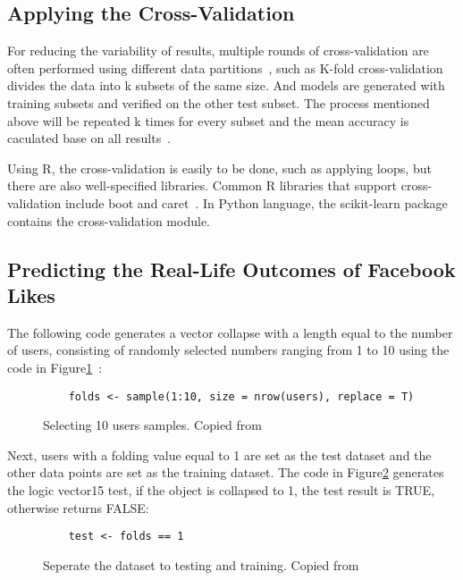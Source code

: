 \subsection{Applying the Cross-Validation~\cite{hid515-12}}

For reducing the variability of results, multiple rounds of 
cross-validation are often performed using different data 
partitions~\cite{hid515-12}, such as  
K-fold cross-validation divides the data 
into k subsets of the same size. 
And models are generated with training subsets and verified on 
the other test subset. The process mentioned above will be repeated
 k times for every subset and the mean accuracy is caculated base 
on all results~\cite{hid515-12}.

Using R, the cross-validation is easily to be done, 
such as applying loops, but there are also 
well-specified libraries. Common R libraries that support 
cross-validation include boot and caret~\cite{hid515-12}. 
In Python language, the scikit-learn package contains the 
cross-validation module.

\subsection{Predicting the Real-Life Outcomes of
Facebook Likes~\cite{hid515-12}}

The following code generates a vector collapse with a length equal
 to the number of users, consisting of randomly selected numbers 
ranging from 1 to 10 using the code in 
Figure\ref{F:select}~\cite{hid515-12}:

\begin{figure}[htb]
\begin{footnotesize}
\begin{verbatim}
    folds <- sample(1:10, size = nrow(users), replace = T)
\end{verbatim}
\end{footnotesize}
\caption{Selecting 10 users samples. Copied from~\cite{hid515-12}}
\label{F:select}
\end{figure}


Next, users with a folding value equal to 1 are set as the 
test dataset and the other data points are set as the training 
dataset. The code in Figure\ref{F:logic} generates the 
logic vector15 test, if 
the object is collapsed to 1, the test result is TRUE, otherwise 
returns FALSE:

\begin{figure}[htb]
\begin{footnotesize}
\begin{verbatim}
    test <- folds == 1
\end{verbatim}
\end{footnotesize}
\caption{Seperate the dataset to testing and training. 
Copied from~\cite{hid515-12}}
\label{F:logic}
\end{figure}



